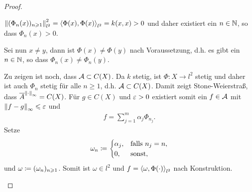 \begin{proof}
\begin{proofenum}
\item $\norm{(\Phi_n(x))_{n\ge 1}}_{l^2}^2 = \lin{\Phi(x),\Phi(x)}_{l^2} =
k(x,x) > 0$ und daher existiert ein $n\in\N$, so dass $\Phi_n(x) > 0$.
\item Sei nun $x\neq y$, dann ist $\Phi(x)\neq \Phi(y)$ nach Voraussetzung, d.h. es
gibt ein $n\in\N$, so dass $\Phi_n(x)\neq \Phi_n(y)$.
\item Zu zeigen ist noch, dass $\AA\subset C(X)$. Da $k$ stetig, ist $\Phi: X\to
l^2$ stetig und daher ist auch $\Phi_n$ stetig für alle $n\ge 1$, d.h.
$\AA\subset C(X)$. Damit zeigt Stone-Weierstraß, dass
$\bar{A}^{\norm{\cdot}_\infty} = C(X)$. Für $g\in C(X)$ und $\ep > 0$ existiert
somit ein $f\in\AA$ mit $\norm{f-g}_\infty \le \ep$ und
\begin{align*}
f = \sum_{j=1}^m \alpha_j \Phi_{n_j}.
\end{align*}
Setze
\begin{align*}
\omega_n \defl 
\begin{cases}
\alpha_j, & \text{falls } n_j = n,\\
0, & \text{sonst},
\end{cases}
\end{align*}
und $\omega\defl (\omega_n)_{n\ge 1}$. Somit ist $\omega\in l^2$ und
$f=\lin{\omega,\Phi(\cdot)}_{l^2}$ nach Konstruktion.\qedhere
\end{proofenum}
\end{proof}

